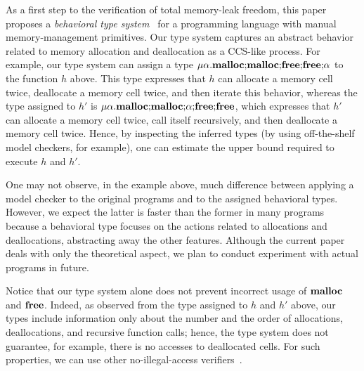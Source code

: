 As a first step to the verification of total memory-leak freedom, this
paper proposes a \emph{behavioral type
  system}~\cite{DBLP:journals/lmcs/KobayashiSW06,DBLP:journals/tcs/IgarashiK04,DBLP:conf/esop/HondaVK98}
for a programming language with manual memory-management primitives.
Our type system captures an abstract behavior related to memory
allocation and deallocation as a CCS-like process.  For example, our
type system can assign a type
\(\mu\alpha.\mathbf{malloc};\!\mathbf{malloc};\!\mathbf{free};\!\mathbf{free};\!\alpha\) to
the function \(h\) above.  This type expresses that \(h\) can allocate
a memory cell twice, deallocate a memory cell twice, and then iterate
this behavior, whereas the type assigned to \(h'\) is
\(\mu\alpha.\mathbf{malloc};\!\mathbf{malloc};\!\alpha;\!\mathbf{free};\!\mathbf{free}\),
which expresses that \(h'\) can allocate a memory cell twice, call
itself recursively, and then deallocate a memory cell twice.  Hence,
by inspecting the inferred types (by using off-the-shelf model
checkers, for example), one can estimate the upper bound required to
execute \(h\) and \(h'\).


One may not observe, in the example above, much difference between
applying a model checker to the original programs and to the assigned
behavioral types.  However, we expect the latter is faster than the
former in many programs because a behavioral type focuses on the
actions related to allocations and deallocations, abstracting away the
other features.  Although the current paper deals with only the
theoretical aspect, we plan to conduct experiment with actual programs
in future.

Notice that our type system alone does not prevent incorrect usage of
\(\mathbf{malloc}\) and \(\mathbf{free}\).  Indeed, as observed from the type assigned
to \(h\) and \(h'\) above, our types include information only about
the number and the order of allocations, deallocations, and recursive
function calls; hence, the type system does not guarantee, for
example, there is no accesses to deallocated cells.  For such
properties, we can use other no-illegal-access verifiers~\cite{DBLP:conf/aplas/SuenagaK09}.

